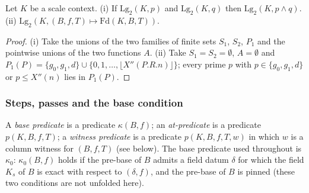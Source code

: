 \begin{lemma}\label{pf:baselat1:large}
Let $K$ be a scale context. (i) If $\mathrm{Lg}_2(K,p)$ and $\mathrm{Lg}_2(K,q)$ then
$\mathrm{Lg}_2(K,p\wedge q)$. (ii) $\mathrm{Lg}_2(K,(B,f,T)\mapsto\mathrm{Fd}(K,B,T))$.
\end{lemma}

\begin{proof}
(i) Take the unions of the two families of finite sets $S_1$, $S_2$, $P_1$ and the pointwise unions of the
two functions $A$. (ii) Take $S_1=S_2=\emptyset$, $A=\emptyset$ and
$P_1(P)=\{g_0,g_1,d\}\cup\{0,1,\dots,\lfloor X''(P.R.n)\rfloor\}$; every prime $p$ with $p\in\{g_0,g_1,d\}$
or $p\le X''(n)$ lies in $P_1(P)$.
\end{proof}

\subsubsection{Steps, passes and the base condition}

A \emph{base predicate} is a predicate $\kappa(B,f)$; an \emph{at-predicate} is a predicate
$p(K,B,f,T)$; a \emph{witness predicate} is a predicate $p(K,B,f,T,w)$ in which $w$ is a column witness
for $(B,f,T)$ (see below). The base predicate used throughout is $\kappa_0$: $\kappa_0(B,f)$ holds if the
pre-base of $B$ admits a field datum $\delta$ for which the field $K_s$ of $B$ is exact with respect to
$(\delta,f)$, and the pre-base of $B$ is pinned (these two conditions are not unfolded here).

